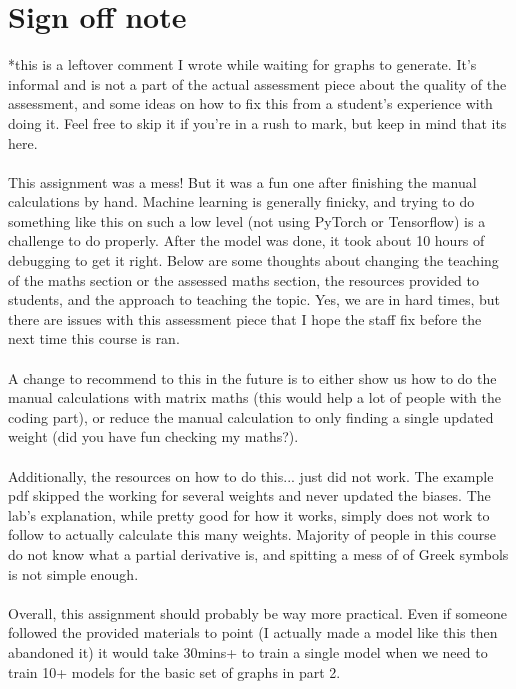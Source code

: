 \documentclass{article}
\begin{document}
\newpage
\section{Sign off note}
*this is a leftover comment I wrote while waiting for graphs to generate. It's
informal and is not a part of the actual assessment piece about the quality of the
assessment, and some ideas on how to fix this from a student's experience with 
doing it. Feel free to skip it if you're in a rush to mark, but keep in mind
that its here. 
\\ \\
This assignment was a mess! But it was a fun one after finishing the manual 
calculations by hand. Machine learning is generally finicky, and trying to do
something like this on such a low level (not using PyTorch or Tensorflow) is a
challenge to do properly. After the model was done, it took about 10 hours of
debugging to get it right. Below are some thoughts about changing the teaching
of the maths section or the assessed maths section, the resources provided to
students, and the approach to teaching the topic. Yes, we are in hard times, 
but there are issues with this assessment piece that I hope the staff 
fix before the next time this course is ran. \\ \\
A change to recommend to this in the future is to either show us how to do the
manual calculations with matrix maths (this would help a lot of people with the
coding part), or reduce the manual calculation to only finding a single updated
weight (did you have fun checking my maths?). \\ \\
Additionally, the resources on how to do this... just did not work. The example
pdf skipped the working for several weights and never updated the biases. 
The lab's explanation, while pretty good for how it works, simply does not work 
to follow to actually calculate this many weights. Majority of people in this 
course do not know what a partial derivative is, and spitting a mess of of 
Greek symbols is not simple enough. \\ \\
Overall, this assignment should probably be way more practical. Even if someone
followed the provided materials to point (I actually made a model like this then
abandoned it) it would take 30mins+ to train a single model when we need to
train 10+ models for the basic set of graphs in part 2. \\
\end{document}
